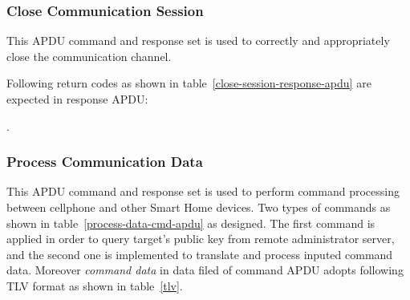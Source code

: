 \subsubsection{Close Communication Session}\label{secSessionClose}
This APDU command and response set is used to correctly and appropriately close the communication channel.


\begin{table}[!htb]
\caption{Close Session Command APDU}
\label{close-session-apdu}
\end{table}

Following return codes as shown in table~\ref{close-session-response-apdu} are expected in response APDU:

.\begin{table}[!htb]
\caption{Close Session Return Code}
\label{close-session-response-apdu}
\end{table}

\subsubsection{Process Communication Data }\sloppy
\begin{table}[!htb]
\caption{Process Data Command APDUs}
\label{process-data-cmd-apdu}
\end{table}
This APDU command and response set is used to perform command processing between cellphone and other Smart Home devices. Two types of commands as shown in table~\ref{process-data-cmd-apdu} as designed. The first command is applied in order to query target's public key from remote administrator server, and the second one is implemented to translate and process inputed command data.
Moreover \emph{command data} in data filed of command APDU adopts following TLV format as shown in table~\ref{tlv}. 

